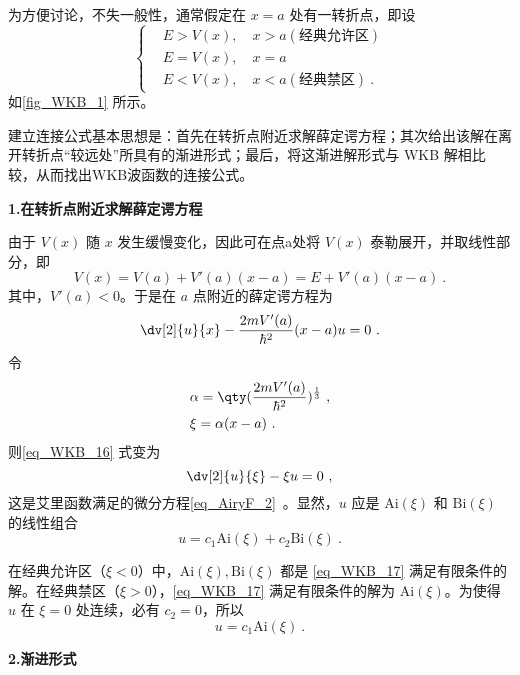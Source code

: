 为方便讨论，不失一般性，通常假定在 $x=a$ 处有一转折点，即设
\begin{equation}
\left\{\begin{aligned}
&E>V(x),\quad x>a(\text{经典允许区})\\
&E=V(x),\quad x=a\\
&E<V(x),\quad x<a(\text{经典禁区})~.
\end{aligned}\right.
\end{equation}
如\autoref{fig_WKB_1} 所示。

建立连接公式基本思想是：首先在转折点附近求解薛定谔方程；其次给出该解在离开转折点“较远处”所具有的渐进形式；最后，将这渐进解形式与 WKB 解相比较，从而找出WKB波函数的连接公式。

\textbf{1.在转折点附近求解薛定谔方程}

由于 $V(x)$ 随 $x$ 发生缓慢变化，因此可在点a处将 $V(x)$ 泰勒展开，并取线性部分，即
\begin{equation}
V(x)=V(a)+V'(a)(x-a)=E+V'(a)(x-a)~.
\end{equation}
 其中，$V'(a)<0$。于是在 $a$ 点附近的薛定谔方程为
 \begin{equation}\label{eq_WKB_16}
 \dv[2]{u}{x}-\frac{2mV'(a)}{\hbar^2}(x-a)u=0~.
 \end{equation}
令
\begin{equation}
\begin{aligned}
&\alpha=\qty(\frac{2mV'(a)}{\hbar^2})^{\frac{1}{3}}~,\\
&\xi=\alpha(x-a)~.
\end{aligned}
\end{equation}
则\autoref{eq_WKB_16} 式变为
\begin{equation}\label{eq_WKB_17}
\dv[2]{u}{\xi}-\xi u=0~,
\end{equation}
这是艾里函数满足的微分方程\autoref{eq_AiryF_2}~。显然，$u$ 应是 $\mathrm{Ai}(\xi)$ 和 $\mathrm{Bi}(\xi)$ 的线性组合
\begin{equation}
u=c_1 \mathrm{Ai}(\xi)+c_2 \mathrm{Bi}(\xi)~.
\end{equation}

在经典允许区（$\xi<0$）中，$\mathrm{Ai}(\xi),\mathrm{Bi}(\xi)$ 都是 \autoref{eq_WKB_17} 满足有限条件的解。在经典禁区（$\xi>0$），\autoref{eq_WKB_17} 满足有限条件的解为 $\mathrm{Ai}(\xi)$。为使得 $u$ 在 $\xi=0$ 处连续，必有 $c_2=0$，所以
\begin{equation}\label{eq_WKB_18}
u=c_1\mathrm{Ai}(\xi)~.
\end{equation}

\textbf{2.渐进形式}

